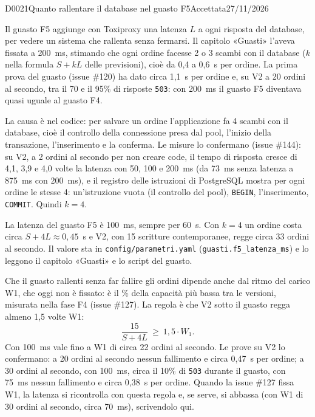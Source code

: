 \begin{decisione}{D0021}{Quanto rallentare il database nel guasto F5}{Accettata}{27/11/2026}

\contesto
Il guasto F5 aggiunge con Toxiproxy una latenza $L$ a ogni risposta del database, per vedere un sistema che rallenta senza fermarsi. Il capitolo «Guasti» l'aveva fissata a 200~ms, stimando che ogni ordine facesse 2 o 3 scambi con il database ($k$ nella formula $S + kL$ delle previsioni), cioè da 0,4 a 0,6~s per ordine. La prima prova del guasto (issue \#120) ha dato circa 1,1~s per ordine e, su V2 a 20 ordini al secondo, tra il 70 e il 95\% di risposte \texttt{503}: con 200~ms il guasto F5 diventava quasi uguale al guasto F4.

La causa è nel codice: per salvare un ordine l'applicazione fa 4 scambi con il database, cioè il controllo della connessione presa dal pool, l'inizio della transazione, l'inserimento e la conferma. Le misure lo confermano (issue \#144): su V2, a 2 ordini al secondo per non creare code, il tempo di risposta cresce di 4,1, 3,9 e 4,0 volte la latenza con 50, 100 e 200~ms (da 73~ms senza latenza a 875~ms con 200~ms), e il registro delle istruzioni di PostgreSQL mostra per ogni ordine le stesse 4: un'istruzione vuota (il controllo del pool), \texttt{BEGIN}, l'inserimento, \texttt{COMMIT}. Quindi $k = 4$.

\scelta
La latenza del guasto F5 è 100~ms, sempre per 60~s. Con $k = 4$ un ordine costa circa $S + 4L \approx 0{,}45$~s e V2, con 15 scritture contemporanee, regge circa 33 ordini al secondo. Il valore sta in \texttt{config/parametri.yaml} (\texttt{guasti.f5\_latenza\_ms}) e lo leggono il capitolo «Guasti» e lo script del guasto.

Che il guasto rallenti senza far fallire gli ordini dipende anche dal ritmo del carico W1, che oggi non è fissato: è il \% della capacità più bassa tra le versioni, misurata nella fase F4 (issue \#127). La regola è che V2 sotto il guasto regga almeno 1,5 volte W1:
\[
  \frac{15}{S + 4L} \ \ge\ 1{,}5 \cdot W_1 .
\]
Con 100~ms vale fino a W1 di circa 22 ordini al secondo. Le prove su V2 lo confermano: a 20 ordini al secondo nessun fallimento e circa 0,47~s per ordine; a 30 ordini al secondo, con 100~ms, circa il 10\% di \texttt{503} durante il guasto, con 75~ms nessun fallimento e circa 0,38~s per ordine. Quando la issue \#127 fissa W1, la latenza si ricontrolla con questa regola e, se serve, si abbassa (con W1 di 30 ordini al secondo, circa 70~ms), scrivendolo qui.


\end{decisione}
